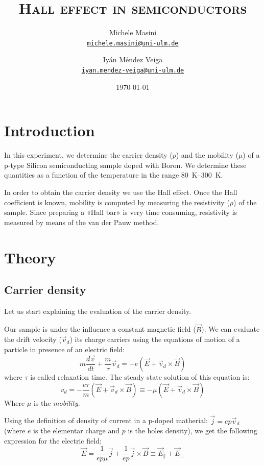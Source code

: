 \documentclass[11pt,a4paper]{article}
\title{\bfseries\textsc{Hall effect in semiconductors}}
\author{
Michele Masini\\ \small\texttt{\href{mailto:michele.masini@uni-ulm.de}{michele.masini@uni-ulm.de}}\and
Iyán Méndez Veiga\\ \small\texttt{\href{mailto:iyan.mendez-veiga@uni-ulm.de}{iyan.mendez-veiga@uni-ulm.de}}
}
\date{\today}
\begin{document}
\maketitle

\section{Introduction}
In this experiment, we determine the carrier density ($p$) and the mobility ($\mu$) of a p-type Silicon semiconducting sample doped with Boron. We determine these quantities as a function of the temperature in the range \SIrange{80}{300}{\kelvin}.

In order to obtain the carrier density we use the Hall effect. Once the Hall coefficient is known, mobility is computed by measuring the resistivity ($\rho$) of the sample. Since preparing a «Hall bar» is very time consuming, resistivity is measured by means of the van der Pauw method.

\section{Theory}

\subsection{Carrier density}
Let us start explaining the evaluation of the carrier density.

Our sample is under the influence a constant magnetic field ($\vec{B}$). We can evaluate the drift velocity ($\vec{v}_d$) its charge carriers using the equations of motion of a particle in presence of an electric field:
\begin{equation*}
m\frac{d\vec{v}}{dt}+\frac{m}{\tau}\vec{v}_d=-e(\vec{E}+\vec{v}_d\times\vec{B})
\end{equation*} where $\tau$ is called relaxation time. The steady state solution of this equation is: 
\begin{equation}
v_d=-\frac{e\tau}{m}(\vec{E}+\vec{v}_d\times\vec{B})\equiv -\mu (\vec{E}+\vec{v}_d\times\vec{B})
\end{equation}Where $\mu$ is the \emph{mobility}. %

Using the definition of density of current in a p-doped matherial: $\vec{j}=ep\vec{v}_d$ (where $e$ is the elementar charge and $p$ is the holes density), we get the following expression for the electric field:
\begin{equation}
\vec{E}=\frac{1}{ep\mu}\vec{j}+\frac{1}{ep}\vec{j}\times\vec{B}\equiv \vec{E}_\parallel+\vec{E}_\perp
\end{equation}
\end{document}
